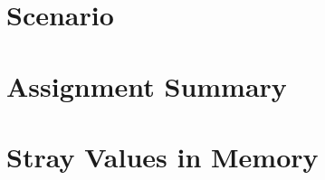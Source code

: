 





\captionsetup{width=.8\linewidth}
\makeatletter
\let\orig@lstnumber=\thelstnumber

\newcommand\lstsetnumber[1]{\gdef\thelstnumber{#1}}
\newcommand\lstresetnumber{\global\let\thelstnumber=\orig@lstnumber}
\makeatother

\renewcommand{\labnumber}{\pointerlabnumber}
\renewcommand{\labname}{Pointer Manipulation Lab \underline{(DRAFT)}}
\renewcommand{\shortlabname}{linkedlistlab}
\renewcommand{\collaborationrules}{\pointerlabcollaboration}
\renewcommand{\duedate}{\pointerlabdue}
\pagelayout

    \labidentifier


    \softwareengineeringfrontmatter

    \section*{Scenario}                                             \ArchieWroteSmellyCode

    \section{Assignment Summary}                                    

    \section{Stray Values in Memory} \label{sec:archiesCode}        

